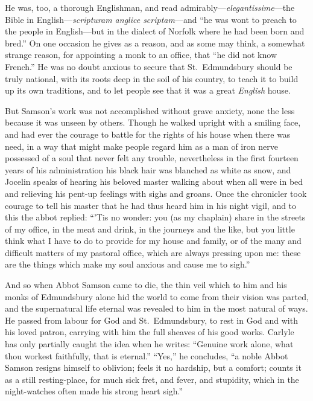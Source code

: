 \documentclass[10pt]{book}
\begin{document}
{{{He was, too, a thorough Englishman, and read admirably---\emph{elegantissime}---the Bible in English---\emph{scripturam anglice scriptam}---and ``he was wont to preach to the people in English---but in the dialect of Norfolk where he had been born and bred.'' On one occasion he gives as a reason, and as some may think, a somewhat strange reason, for appointing a monk to an office, that ``he did not know French.'' He was no doubt anxious to secure that St.\ Edmundsbury should be truly national, with its roots deep in the soil of his country, to teach it to build up its own traditions, and to let people see that it was a great \emph{English} house.

But Samson's work was not accomplished without grave anxiety, none the less because it was unseen by others. Though he walked upright with a smiling face, and had ever the courage to battle for the rights of his house when there was need, in a way that might make people regard him as a man of iron nerve possessed of a soul that never felt any trouble, nevertheless in the first fourteen years of his administration his black hair was blanched as white as snow, and Jocelin speaks of hearing his beloved master walking about when all were in bed and relieving his pent-up feelings with sighs and groans. Once the chronicler took courage to tell his master that he had thus heard him in his night vigil, and to this the abbot replied: ``'Tis no wonder: you (as my chaplain) share in the streets of my office, in the meat and drink, in the journeys and the like, but you little think what I have to do to provide for my house and family, or of the many and difficult matters of my pastoral office, which are always pressing upon me: these are the things which make my soul anxious and cause me to sigh.''

And so when Abbot Samson came to die, the thin veil which to him and his monks of Edmundsbury alone hid the world to come from their vision was parted, and the supernatural life eternal was revealed to him in the most natural of ways. He passed from labour for God and St.\ Edmundsbury, to rest in God and with his loved patron, carrying with him the full sheaves of his good works. Carlyle has only partially caught the idea when he writes: ``Genuine work alone, what thou workest faithfully, that is eternal.'' ``Yes,'' he concludes, ``a noble Abbot Samson resigns himself to oblivion; feels it no hardship, but a comfort; counts it as a still resting-place, for much sick fret, and fever, and stupidity, which in the night-watches often made his strong heart sigh.''
}
}
}
\end{document}
